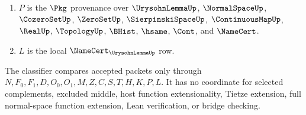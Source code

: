 \begin{definition}
\begin{enumerate}
\item $P$ is the $\Pkg$ provenance over $\UrysohnLemmaUp$, $\NormalSpaceUp$, $\CozeroSetUp$, $\ZeroSetUp$, $\SierpinskiSpaceUp$, $\ContinuousMapUp$, $\RealUp$, $\TopologyUp$, $\BHist$, $\hsame$, $\Cont$, and $\NameCert$.
\item $L$ is the local $\NameCert_{\UrysohnLemmaUp}$ row.
\end{enumerate}
The classifier compares accepted packets only through $N,F_0,F_1,D,O_0,O_1,M,Z,C,S,T,H,K,P,L$. It has no coordinate for selected complements, excluded middle, host function extensionality, Tietze extension, full normal-space function extension, Lean verification, or bridge checking.
\end{definition}

